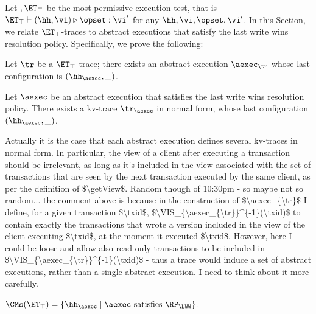 Let $,\ET_\top$ be the most permissive execution test, that is 
$\ET_\top \vdash (\hh, \vi) \triangleright \opset: \vi'$ for any $\hh, \vi, \opset, \vi'$. 
In this Section, we relate $\ET_{\top}$-traces to abstract executions that satisfy the last write wins 
resolution policy. Specifically, we prove the following: 
\begin{theorem}
\label{thm:kvtrace2aexec}
Let $\tr$ be a $\ET_{\top}$-trace; there exists an abstract execution $\aexec_{\tr}$ 
whose last configuration is $(\hh_{\aexec}, \_)$.

Let $\aexec$ be an abstract execution that satisfies the last write wins resolution policy. 
There exists a kv-trace $\tr_{\aexec}$ in normal form, whose last configuration $(\hh_{\aexec}, \_)$. 
\end{theorem}

\ac{Actually it is the case that each abstract execution defines several kv-traces in normal form. 
In particular, the view of a client after executing a transaction should be irrelevant, as long as it's 
included in the view associated with the set of transactions that are seen by the next transaction 
executed by the same client, as per the definition of $\getView$.}
\ac{Random though of 10:30pm - so maybe not so random... the comment above is because in the construction of 
$\aexec_{\tr}$ I define, for a given transaction $\txid$, $\VIS_{\aexec_{\tr}}^{-1}(\txid)$ to contain 
exactly the transactions that wrote a version included in the view of the client executing $\txid$, at the 
moment it executed $\txid$. However, here I could be loose and allow also read-only transactions 
to be included in $\VIS_{\aexec_{\tr}}^{-1}(\txid)$ - thus a trace would induce a set of 
abstract executions, rather than a single abstract execution. I need to think about it more carefully. }

\begin{corollary} 
\label{cor:kvtrace2aexec}
$\CMs(\ET_{\top}) = \{\hh_{\aexec} \mid \aexec \text{ satisfies } \RP_{\LWW}\}$.
\end{corollary}


